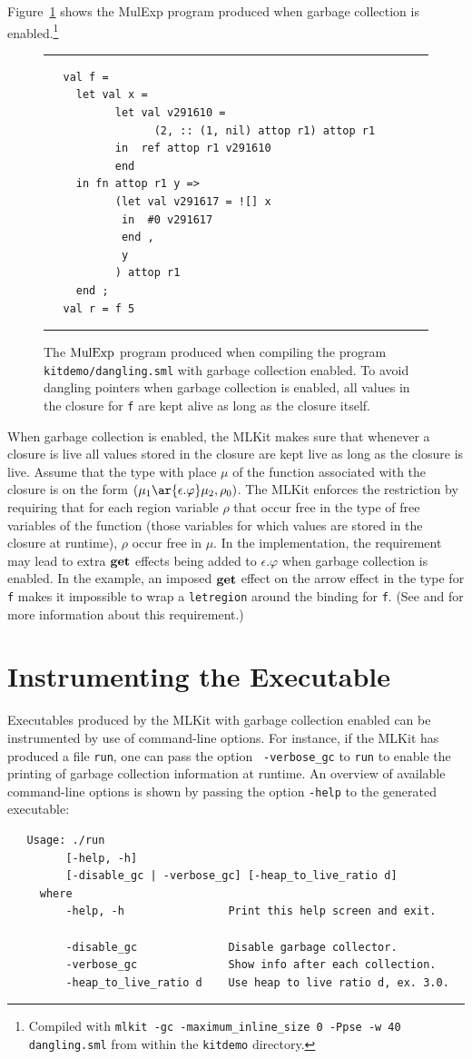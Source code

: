 \documentclass[12pt]{book}
\begin{document}
Figure~\ref{dangling_gc.fig} shows the MulExp program produced when
garbage collection is enabled.\footnote{Compiled with {\tt mlkit -gc
    -maximum\_inline\_size 0 -Ppse -w 40 dangling.sml} from within the
  {\tt kitdemo} directory.}
\begin{figure}[ht]
\hrule \medskip
\begin{verbatim}
   val f = 
     let val x = 
           let val v291610 = 
                 (2, :: (1, nil) attop r1) attop r1
           in  ref attop r1 v291610
           end 
     in fn attop r1 y => 
           (let val v291617 = ![] x
            in  #0 v291617
            end , 
            y
           ) attop r1
     end ; 
   val r = f 5
\end{verbatim}
\caption{The $\hbox{\rm MulExp}$ program produced when compiling the program 
  {\tt kitdemo/dangling.sml} with garbage collection enabled. To avoid
  dangling pointers when garbage collection is enabled, all values in
  the closure for {\tt f} are kept alive as long as the closure
  itself.}  \medskip \hrule
\label{dangling_gc.fig}
\end{figure}
When garbage collection is enabled, the MLKit makes sure that whenever
a closure is live all values stored in the closure are kept live as
long as the closure is live.  Assume that the type with place $\mu$ of
the function associated with the closure is on the form $(\mu_1
\ar{\epsilon.\varphi} \mu_2, \rho_0)$.  The MLKit enforces the
restriction by requiring that for each region variable $\rho$ that
occur free in the type of free variables of the function (those
variables for which values are stored in the closure at runtime),
$\rho$ occur free in $\mu$. In the implementation, the requirement may
lead to extra $\mathop{\bf get}\nolimits$ effects being added to $\epsilon.\varphi$ when
garbage collection is enabled. In the example, an imposed $\mathop{\bf get}\nolimits$
effect on the arrow effect in the type for {\tt f} makes it impossible
to wrap a {\tt letregion} around the binding for {\tt f}. (See
\cite[page 50]{total93} and \cite{elsman:tldi03} for more information
about this requirement.)

\section{Instrumenting the Executable}
Executables produced by the MLKit with garbage collection enabled can be
instrumented by use of command-line options. For instance, if the MLKit
has produced a file {\tt run}, one can pass the option {\tt
  -verbose\_gc} to {\tt run} to enable the printing of garbage
collection information at runtime. An overview of available
command-line options is shown by passing the option {\tt -help} to the
generated executable: {\small
\begin{verbatim}
   Usage: ./run
         [-help, -h] 
         [-disable_gc | -verbose_gc] [-heap_to_live_ratio d] 
     where
         -help, -h                Print this help screen and exit.

         -disable_gc              Disable garbage collector.
         -verbose_gc              Show info after each collection.
         -heap_to_live_ratio d    Use heap to live ratio d, ex. 3.0.
\end{verbatim}
}
\end{document}
